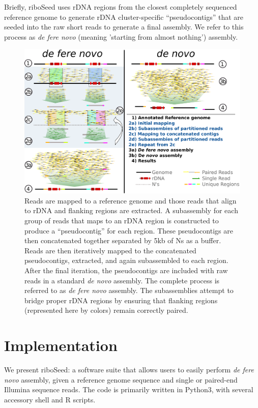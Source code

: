 \documentclass[10pt]{article}
\begin{document}
\begin{linenumbers}
Briefly, riboSeed uses rDNA regions from the closest completely sequenced reference genome to generate rDNA cluster-specific ``pseudocontigs'' that are seeded into the raw short reads to generate a final assembly. We refer to this process as \textit{de fere novo} (meaning 'starting from almost nothing') assembly.


\begin{figure}[!h]
  \centering
  \includegraphics[width=.8\textwidth]{riboSeed_v11}
  \caption{Reads are mapped to a reference genome and those reads that align to rDNA and flanking regions are extracted. A subassembly for each group of reads that maps to an rDNA region is constructed to produce a ``pseudocontig'' for each region. These pseudocontigs are then concatenated together separated by 5kb of Ns as a buffer. Reads are then iteratively mapped to the concatenated pseudocontigs, extracted, and again subassembled to each region. After the final iteration, the pseudocontigs are included with raw reads in a standard \textit{de novo} assembly. The complete process is referred to as \textit{de fere novo} assembly. The subassemblies attempt to bridge proper rDNA regions by ensuring that flanking regions (represented here by colors) remain correctly paired.
  }
  \label{fig:overview}
\end{figure}




\section*{Implementation}
We present riboSeed: a software suite that allows users to easily perform \textit{de fere novo} assembly, given a reference genome sequence and single or paired-end Illumina sequence reads. The code is primarily written in Python3, with several accessory shell and R scripts.



\end{linenumbers}
\end{document}

